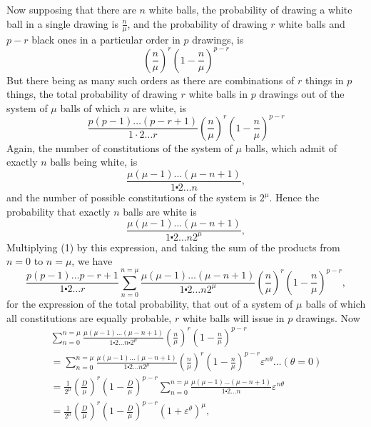 \documentclass[oneside]{book}
\begin{document}
Now supposing that there are $n$ white balls, the probability
of drawing a white ball in a single drawing is $\frac{n}{\mu}$, and the probability of drawing $r$ white balls and $p-r$ black ones in a particular order in $p$ drawings, is
\[
  \left( \frac{n}{\mu} \right)^r
  \left( 1 - \frac{n}{\mu} \right)^{p-r}
\]
But there being as many such orders as there are combinations
of $r$ things in $p$ things, the total probability of drawing $r$ white
balls in $p$ drawings out of the system of $\mu$ balls of which $n$ are
white, is
\[
  \frac{ p(p-1) \dotsc (p-r+1) }{ 1 \cdot 2 \dotsc r }
  \left( \frac{n}{\mu} \right)^r
  \left( 1 - \frac{n}{\mu} \right)^{p-r} \tag{1}
\]
Again, the number of constitutions of the system of $\mu$ balls, which
admit of exactly $n$ balls being white, is
\[
  \frac{\mu(\mu-1) \dotsc (\mu-n+1)}{1 \centerdot 2 \dotsc n},
\]
and the number of possible constitutions of the system is $2^\mu$.
Hence the probability that exactly $n$ balls are white is
\[
  \frac{\mu(\mu-1) \dotsc (\mu-n+1)}{1 \centerdot 2 \dotsc n 2^\mu},
\]
Multiplying (1) by this expression, and taking the sum of the
products from $n = 0$ to $n = \mu$, we have
\[
  \frac{p(p-1) \dotsc p-r+1}{1 \centerdot 2 \dotsc r}
  \sum_{n=0}^{n=\mu}
  \frac{\mu(\mu-1) \dotsc (\mu-n+1)}{1 \centerdot 2 \dotsc n 2^\mu}
  \left( \frac{n}{\mu} \right)^r
  \left( 1-\frac{n}{\mu} \right)^{p-r} ,   \tag{2}
\]
for the expression of the total probability, that out of a system
of $\mu$ balls of which all constitutions are equally probable, $r$ white
balls will issue in $p$ drawings. Now
\begin{gather*}
  \sum_{n=0}^{n=\mu}
  \frac{\mu(\mu-1) \dotsc (\mu-n+1)}
       {1 \centerdot 2 \dotsc n \centerdot 2^\mu}
  \left( \frac{n}{\mu} \right)^r
  \left( 1-\frac{n}{\mu} \right)^{p-r}
\\
= \sum_{n=0}^{n=\mu}
  \frac{\mu(\mu-1) \dotsc (\mu-n+1)}
       {1 \centerdot 2 \dotsc n 2^\mu}
  \left( \frac{n}{\mu} \right)^r
  \left( 1-\frac{n}{\mu} \right)^{p-r}
  \varepsilon^{n\theta} \dotso (\theta = 0)
\\
= \frac{1}{2^\mu}
  \left( \frac{D}{\mu} \right)^r
  \left( 1-\frac{D}{\mu} \right)^{p-r}
  \sum_{n=0}^{n=\mu}
  \frac{\mu(\mu-1) \dotsc (\mu-n+1)}
       {1 \centerdot 2 \dotsc n}
  \varepsilon^{n\theta}
\\
= \frac{1}{2^\mu}
  \left( \frac{D}{\mu} \right)^r
  \left( 1-\frac{D}{\mu} \right)^{p-r}
  (1 + \varepsilon^\theta)^\mu,        \tag{3}
\end{gather*}
\end{document}
